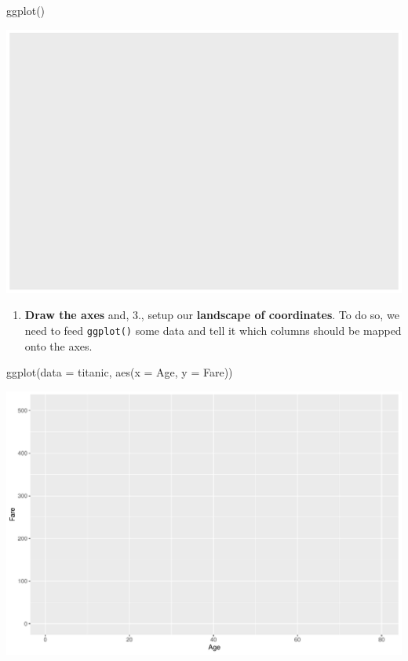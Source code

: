 \documentclass[
]{book}
\newenvironment{Shaded}{\begin{snugshade}}{\end{snugshade}}
\newcommand{\AttributeTok}[1]{\textcolor[rgb]{0.77,0.63,0.00}{#1}}
\newcommand{\FunctionTok}[1]{\textcolor[rgb]{0.00,0.00,0.00}{#1}}
\newcommand{\NormalTok}[1]{#1}
\providecommand{\tightlist}{%
  \setlength{\itemsep}{0pt}\setlength{\parskip}{0pt}}
\begin{document}
\begin{Shaded}
\begin{Highlighting}[]
\FunctionTok{ggplot}\NormalTok{()}
\end{Highlighting}
\end{Shaded}

\includegraphics[width=694.08px]{figures/unnamed-chunk-156-1}

\begin{enumerate}
\def\labelenumi{(\arabic{enumi})}
\setcounter{enumi}{1}
\tightlist
\item
  \textbf{Draw the axes} and, 3., setup our \textbf{landscape of coordinates}. To do so, we need to feed \texttt{ggplot()} some data and tell it which columns should be mapped onto the axes.
\end{enumerate}

\begin{Shaded}
\begin{Highlighting}[]
\FunctionTok{ggplot}\NormalTok{(}\AttributeTok{data =}\NormalTok{ titanic, }
       \FunctionTok{aes}\NormalTok{(}\AttributeTok{x =}\NormalTok{ Age, }\AttributeTok{y =}\NormalTok{ Fare))}
\end{Highlighting}
\end{Shaded}

\includegraphics[width=694.08px]{figures/unnamed-chunk-157-1}
\end{document}
